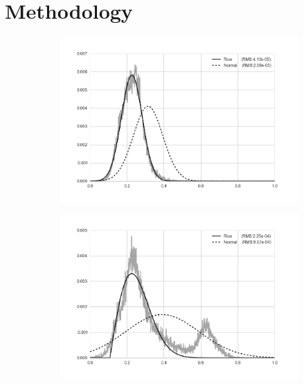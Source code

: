 \section{Methodology}
\label{sec:method}
\graphicspath{ {./content/method/figures/} }

\begin{figure}[t]
    \centering
    \begin{subfigure}[b]{0.30\textwidth}
        \centering
        \includegraphics[width=\textwidth]{03}
    \end{subfigure}
    \hfill
    \begin{subfigure}[b]{0.30\textwidth}
        \centering
        \includegraphics[width=\textwidth]{06}
    \end{subfigure}
    \hfill
    \begin{subfigure}[b]{0.30\textwidth}

\end{subfigure}
\end{figure}
